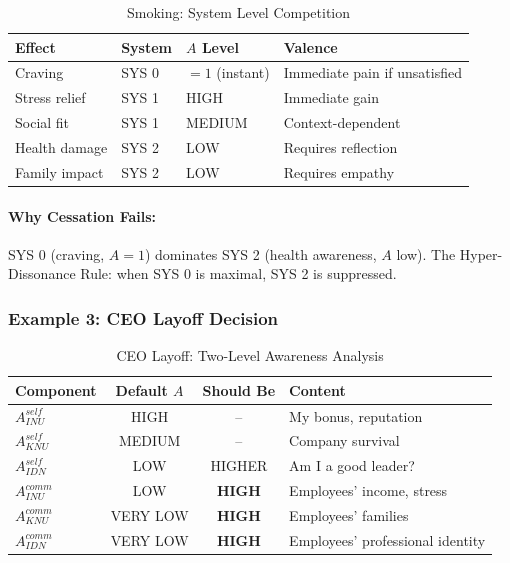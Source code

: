 \begin{table}[htbp]
\centering
\caption{Smoking: System Level Competition}
\label{tab:smoking-systems}
\renewcommand{\arraystretch}{1.3}
\begin{tabular}{@{}llll@{}}
\toprule
\textbf{Effect} & \textbf{System} & \textbf{$A$ Level} & \textbf{Valence} \\
\midrule
Craving & SYS 0 & $= 1$ (instant) & Immediate pain if unsatisfied \\
Stress relief & SYS 1 & HIGH & Immediate gain \\
Social fit & SYS 1 & MEDIUM & Context-dependent \\
Health damage & SYS 2 & LOW & Requires reflection \\
Family impact & SYS 2 & LOW & Requires empathy \\
\bottomrule
\end{tabular}
\end{table}

\paragraph{Why Cessation Fails:}
SYS 0 (craving, $A = 1$) dominates SYS 2 (health awareness, $A$ low).
The Hyper-Dissonance Rule: when SYS 0 is maximal, SYS 2 is suppressed.

\subsubsection{Example 3: CEO Layoff Decision}

\begin{table}[htbp]
\centering
\caption{CEO Layoff: Two-Level Awareness Analysis}
\label{tab:ceo-awareness}
\renewcommand{\arraystretch}{1.3}
\begin{tabular}{@{}lccl@{}}
\toprule
\textbf{Component} & \textbf{Default $A$} & \textbf{Should Be} & \textbf{Content} \\
\midrule
$A^{self}_{INU}$ & HIGH & -- & My bonus, reputation \\
$A^{self}_{KNU}$ & MEDIUM & -- & Company survival \\
$A^{self}_{IDN}$ & LOW & HIGHER & Am I a good leader? \\
$A^{comm}_{INU}$ & LOW & \textbf{HIGH} & Employees' income, stress \\
$A^{comm}_{KNU}$ & VERY LOW & \textbf{HIGH} & Employees' families \\
$A^{comm}_{IDN}$ & VERY LOW & \textbf{HIGH} & Employees' professional identity \\
\bottomrule
\end{tabular}
\end{table}

